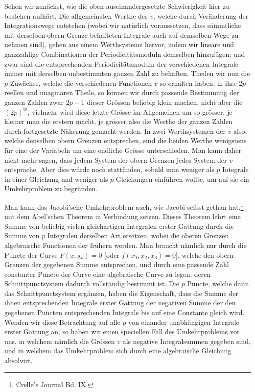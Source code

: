 \documentclass[10pt]{article}
\begin{document}
Sehen wir zunächst, wie die oben auseinandergesetzte Schwierigkeit hier zu bestehen aufhört. Die allgemeinsten Werthe der \(v\), welche durch Veränderung der Integrationswege entstehen (wobei wir natürlich voraussetzen, dass sämmtliche mit derselben obern Grenze behafteten Integrale auch auf demselben Wege zu nehmen sind), gehen aus einem Werthsysteme hervor, indem wir lineare und ganzzahlige Combinationen der Periodicitätsmoduln demselben hinzufügen; und zwar sind die entsprechenden Periodicitätsmoduln der verschiedenen Integrale immer mit derselben unbestimmten ganzen Zahl zu behaften. Theilen wir nun die \(p\) Zuwächse, welche die verschiedenen Functionen \(v\) so erhalten haben, in ihre \(2p\) reellen und imaginären Theile, so können wir durch passende Bestimmung der ganzen Zahlen zwar \(2p-1\) dieser Grössen beliebig klein machen, nicht aber die \((2p)^{\mathrm{te}}\), vielmehr wird diese letzte Grösse im Allgemeinen um so grösser, je kleiner man die erstern macht, je grösser also die Werthe der ganzen Zahlen durch fortgesetzte Näherung gemacht werden. In zwei Werthsystemen der \(v\) also, welche denselben obern Grenzen entsprechen, sind die beiden Werthe wenigstens für eine der Variabeln um eine endliche Grösse unterschieden. Man kann daher nicht mehr sagen, dass jedem System der obern Grenzen jedes System der \(v\) entspräche. Aber dies würde noch stattfinden, sobald man weniger als \(p\) Integrale in einer Gleichung und weniger als \(p\) Gleichungen einführen wollte, um auf sie ein Umkehrproblem zu begründen.

Man kann das Jacobi'sche Umkehrproblem auch, wie Jacobi selbst gethan hat,\footnote{Crelle's Journal Bd. IX.} mit dem Abel'schen Theorem in Verbindung setzen. Dieses Theorem lehrt eine Summe von beliebig vielen gleichartigen Integralen erster Gattung durch die Summe von \(p\) Integralen derselben Art ersetzen, wobei die oberen Grenzen algebraische Functionen der frühern werden. Man braucht nämlich nur durch die Puncte der Curve \(F(x,s_x)=0\) [oder \(f(x_1,x_2,x_3)=0\)], welche den obern Grenzen der gegebenen Summe entsprechen, und durch eine passende Zahl constanter Puncte der Curve eine algebraische Curve zu legen, deren Schnittpunctsystem dadurch vollständig bestimmt ist. Die \(p\) Puncte, welche dann das Schnittpunctsystem ergänzen, haben die Eigenschaft, dass die Summe der ihnen entsprechenden Integrale erster Gattung der negativen Summe der den gegebenen Puncten entsprechenden Integrale bis auf eine Constante gleich wird. Wenden wir diese Betrachtung auf alle \(p\) von einander unabhängigen Integrale erster Gattung an, so haben wir einen speciellen Fall des Umkehrproblems vor uns, in welchem nämlich die Grössen \(v\) als negative Integralsummen gegeben sind, und in welchem das Umkehrproblem sich durch eine algebraische Gleichung absolvirt.
\end{document}
